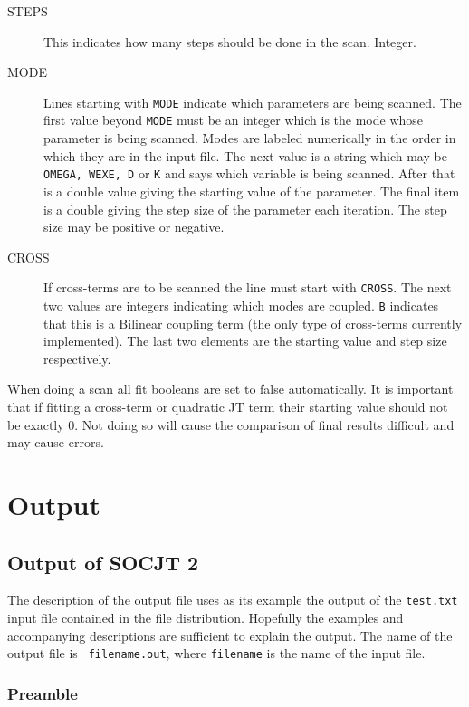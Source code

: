 \documentclass{article}
\newcommand{\socjttwo}{{\bf SOCJT 2}}
\begin{document}
\begin{description}
\item[STEPS] This indicates how many steps should be done in the scan.
Integer.

\item[MODE] Lines starting with {\tt MODE} indicate which parameters are being 
scanned. The first value beyond {\tt MODE} must be an integer which is the mode
whose parameter is being scanned. Modes are labeled numerically in the order
in which they are in the input file. The next value is a string which may be
{\tt OMEGA, WEXE, D} or {\tt K} and says which variable is being scanned. After that 
is a double value giving the starting value of the parameter. The final
item is a double giving the step size of the parameter each iteration. 
The step size may be positive or negative.

\item[CROSS] If cross-terms are to be scanned the line must start with 
{\tt CROSS}. The next two values are integers indicating which modes are coupled.
{\tt B} indicates that this is a Bilinear coupling term (the only type
of cross-terms currently implemented). The last two elements are the starting
value and step size respectively.

\end{description}

When doing a scan all fit booleans are set to false automatically. It is important
that if fitting a cross-term or quadratic JT term their starting value should not
be exactly 0. Not doing so will cause the comparison of final results difficult and may
cause errors.

\section{Output} \label{section:output}

\subsection{Output of \socjttwo }

The description of the output file uses as its example the output of
the {\tt test.txt} input file contained in the file
distribution. Hopefully the examples and accompanying descriptions are
sufficient to explain the output. The name of the output file is {\tt
  filename.out}, where {\tt filename} is the name of the input file.

\subsubsection{Preamble}
\end{document}
